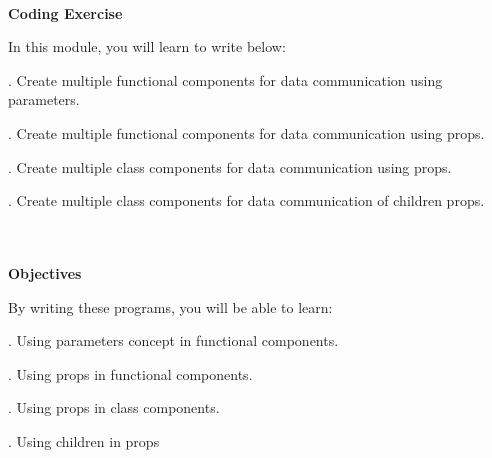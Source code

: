 \documentclass{article}
\begin{document}
\noindent \textbf{\underbar{}}


\noindent 

\noindent \\
 \textbf{Coding Exercise}

\noindent 
 In this module, you will learn to write below:

. Create multiple functional components for data communication using parameters.

. Create multiple functional components for data communication using props.

. Create multiple class components for data communication using props.

. Create multiple class components for data communication of children props.

\noindent 

\noindent \\\\

\noindent \textbf{Objectives}

\noindent 
By writing these programs, you will be able to learn:

. Using parameters concept in functional components.

. Using props in functional components.

. Using props in class components.

. Using children in props
\end{document}
